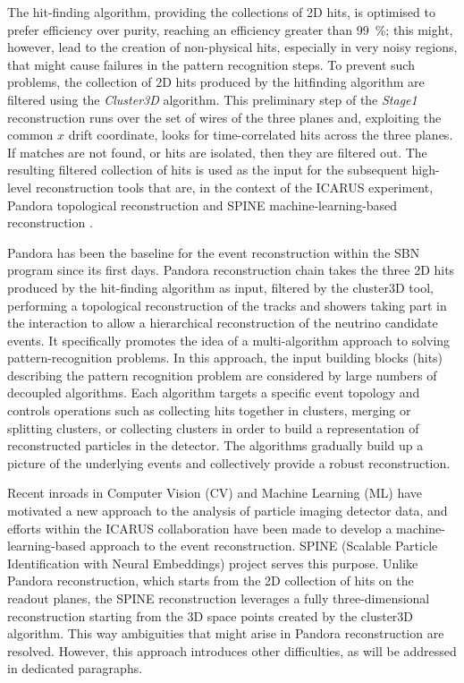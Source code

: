 The hit-finding algorithm, providing the collections of 2D hits, is optimised to prefer efficiency over purity, reaching an efficiency greater than \SI{99}{\percent}; this might, however, lead to the creation of non-physical hits, especially in very noisy regions, that might cause failures in the pattern recognition steps. To prevent such problems, the collection of 2D hits produced by the hitfinding algorithm are filtered using the \emph{Cluster3D} algorithm. This preliminary step of the \emph{Stage1} reconstruction runs over the set of wires of the three planes and, exploiting the common $x$ drift coordinate, looks for time-correlated hits across the three planes. If matches are not found, or hits are isolated, then they are filtered out. The resulting filtered collection of hits is used as the input for the subsequent high-level reconstruction tools that are, in the context of the ICARUS experiment, Pandora topological reconstruction \cite{MicroBooNE:2017xvs} and SPINE machine-learning-based reconstruction \cite{Drielsma:2021jdv}. 

Pandora has been the baseline for the event reconstruction within the SBN program since its first days. Pandora reconstruction chain takes the three 2D hits produced by the hit-finding algorithm as input, filtered by the cluster3D tool, performing a topological reconstruction of the tracks and showers taking part in the interaction to allow a hierarchical reconstruction of the neutrino candidate events. It specifically promotes the idea of a multi-algorithm approach to solving pattern-recognition problems. In this approach, the input building blocks (hits) describing the pattern recognition problem are considered by large numbers of decoupled algorithms. Each algorithm targets a specific event topology and controls operations such as collecting hits together in clusters, merging or splitting clusters, or collecting clusters in order to build a representation of reconstructed particles in the detector. The algorithms gradually build up a picture of the underlying events and collectively provide a robust reconstruction. %


Recent inroads in Computer Vision (CV) and Machine Learning (ML) have motivated a new approach to the analysis of particle imaging detector data, and efforts within the ICARUS collaboration have been made to develop a machine-learning-based approach to the event reconstruction. SPINE (Scalable Particle Identification with Neural Embeddings) project serves this purpose. Unlike Pandora reconstruction, which starts from the 2D collection of hits on the readout planes, the SPINE reconstruction leverages a fully three-dimensional reconstruction starting from the 3D space points created by the cluster3D algorithm. This way ambiguities that might arise in Pandora reconstruction are resolved. However, this approach introduces other difficulties, as will be addressed in dedicated paragraphs. 

